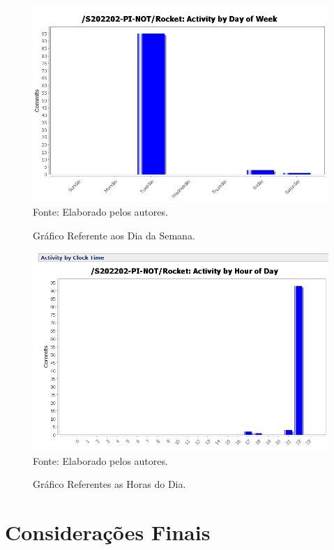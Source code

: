 \documentclass[
    12pt,               %
    openright,          %
    oneside,
    a4paper,            %
    BIBLATEX,           %
    TODO,               %
    english,            %
    brazil              %
    ]{ifsp-spo-inf-ctds}
\begin{document}
    \begin{figure}[H]
                \centering
                \caption{Gráfico Referente aos Dia da Semana.}
                \includegraphics[width=1 \textwidth]{StatSVN/DiadaSemana.png}
                {\footnotesize Fonte: Elaborado pelos autores.}
                \label{fig:diaSemana}
            \end{figure}
    
    \begin{figure}[H]
                \centering
                \caption{Gráfico Referentes as Horas do Dia.}
                \includegraphics[width=1 \textwidth]{StatSVN/HoradoDia.png}
                {\footnotesize Fonte: Elaborado pelos autores.}
                \label{fig:horaDia}
            \end{figure}
 

\chapter[Considerações Finais]{Considerações Finais}
\end{document}
